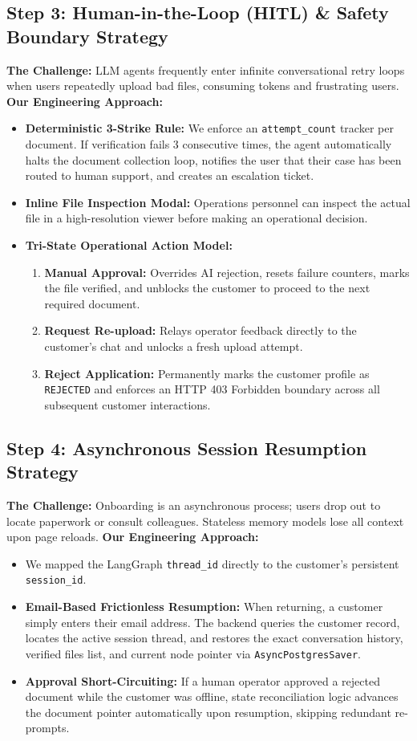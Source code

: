 \documentclass[12pt,a4paper]{article}
\begin{document}
\subsection{Step 3: Human-in-the-Loop (HITL) \& Safety Boundary Strategy}
\textbf{The Challenge:} LLM agents frequently enter infinite conversational retry loops when users repeatedly upload bad files, consuming tokens and frustrating users.
\textbf{Our Engineering Approach:}
\begin{itemize}
    \item \textbf{Deterministic 3-Strike Rule:} We enforce an \texttt{attempt\_count} tracker per document. If verification fails 3 consecutive times, the agent automatically halts the document collection loop, notifies the user that their case has been routed to human support, and creates an escalation ticket.
    \item \textbf{Inline File Inspection Modal:} Operations personnel can inspect the actual file in a high-resolution viewer before making an operational decision.
    \item \textbf{Tri-State Operational Action Model:}
        \begin{enumerate}
            \item \textbf{Manual Approval:} Overrides AI rejection, resets failure counters, marks the file verified, and unblocks the customer to proceed to the next required document.
            \item \textbf{Request Re-upload:} Relays operator feedback directly to the customer's chat and unlocks a fresh upload attempt.
            \item \textbf{Reject Application:} Permanently marks the customer profile as \texttt{REJECTED} and enforces an HTTP 403 Forbidden boundary across all subsequent customer interactions.
        \end{enumerate}
\end{itemize}

\subsection{Step 4: Asynchronous Session Resumption Strategy}
\textbf{The Challenge:} Onboarding is an asynchronous process; users drop out to locate paperwork or consult colleagues. Stateless memory models lose all context upon page reloads.
\textbf{Our Engineering Approach:}
\begin{itemize}
    \item We mapped the LangGraph \texttt{thread\_id} directly to the customer's persistent \texttt{session\_id}.
    \item \textbf{Email-Based Frictionless Resumption:} When returning, a customer simply enters their email address. The backend queries the customer record, locates the active session thread, and restores the exact conversation history, verified files list, and current node pointer via \texttt{AsyncPostgresSaver}.
    \item \textbf{Approval Short-Circuiting:} If a human operator approved a rejected document while the customer was offline, state reconciliation logic advances the document pointer automatically upon resumption, skipping redundant re-prompts.
\end{itemize}
\end{document}
